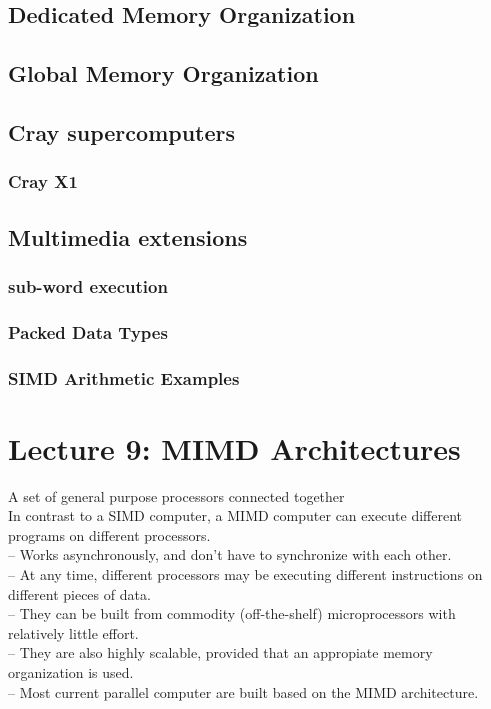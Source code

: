 \documentclass[titlepage, a4paper]{article}
\begin{document}
\subsection{Dedicated Memory Organization}
\subsection{Global Memory Organization}
\subsection{Cray supercomputers}
\subsubsection{Cray X1}
\subsection{Multimedia extensions}
\subsubsection{sub-word execution}
\subsubsection{Packed Data Types}
\subsubsection{SIMD Arithmetic Examples}

\section{Lecture 9: MIMD Architectures}
A set of general purpose processors connected together \\
In contrast to a SIMD computer, a MIMD computer can execute different programs on different processors. \\

-- Works asynchronously, and don't have to synchronize with each other. \\
-- At any time, different processors may be executing different instructions on different pieces of data. \\
-- They can be built from commodity (off-the-shelf) microprocessors with relatively little effort. \\
-- They are also highly scalable, provided that an appropiate memory organization is used. \\
-- Most current parallel computer are built based on the MIMD architecture. \\
\end{document}
